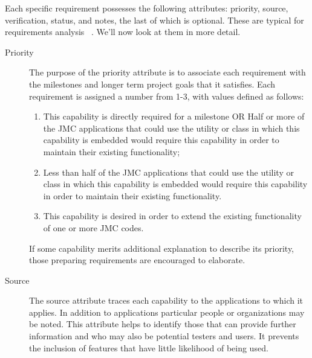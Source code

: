 %

Each specific requirement possesses the following attributes:  priority, 
source, verification, status, and notes, the last of which is optional.  
These are typical for requirements
analysis ~\cite{wiegers}.  We'll now look at them in more detail.

\begin{description}
\item [Priority] The purpose of the priority attribute is to associate
each requirement with the milestones and longer term project goals that 
it satisfies.  Each requirement is assigned a number from 1-3, with
values defined as follows:
\begin{enumerate}

\item This capability is directly required for a milestone OR
Half or more of the JMC applications that could use the utility or class
in which this capability is embedded would require this
capability in order to maintain their existing functionality;
 
\item Less than half of the JMC applications that could use
the utility or class in which this capability is embedded 
would require this capability in order to maintain their existing
functionality.

\item This capability is desired in order to extend
the existing functionality of one or more JMC codes.

\end{enumerate}

If some capability merits additional explanation to describe 
its priority, those preparing requirements are encouraged 
to elaborate.
 
\item [Source] The source attribute traces each capability
to the applications to which it applies.  In addition to applications
particular people or organizations may be noted.   This attribute 
helps to identify those that can provide further 
information and who may also be potential testers and users.  It
prevents the inclusion of features that have little likelihood of
being used.


\end{description}
